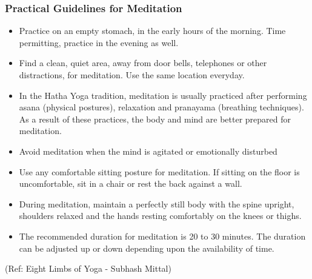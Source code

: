 \begin{frame}[fragile]\frametitle{Practical Guidelines for Meditation}


	\begin{itemize}
	\item Practice on an empty stomach, in the early hours of the 
morning. Time permitting, practice in the evening as well.
	\item Find a clean, quiet area, away from door bells, telephones or other 
distractions, for meditation. Use the same location everyday. 
	\item In the Hatha Yoga tradition, meditation is usually practiced after 
performing asana (physical postures), relaxation and pranayama
(breathing techniques). As a result of these practices, the body and mind 
are better prepared for meditation.
	\item  Avoid meditation when the mind is agitated or emotionally disturbed
	\item Use any comfortable sitting posture for meditation. If sitting on the floor is 
uncomfortable, sit in a chair or rest the back against a wall.
	\item  During meditation, maintain a perfectly still body with the spine upright, 
shoulders relaxed and the hands resting comfortably on the knees or 
thighs.
	\item  The recommended duration for meditation is 20 to 30 minutes. The 
duration can be adjusted up or down depending upon the availability of 
time.
	\end{itemize}

\tiny{(Ref: Eight Limbs of Yoga - Subhash Mittal)}

\end{frame}
